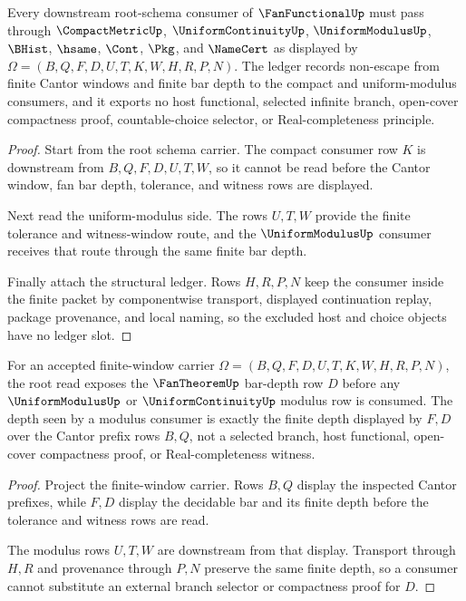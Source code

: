 \begin{theorem}
\label{thm:fanfunctional-root-schema-ledger}
Every downstream root-schema consumer of $\FanFunctionalUp$ must pass through $\CompactMetricUp$, $\UniformContinuityUp$, $\UniformModulusUp$, $\BHist$, $\hsame$, $\Cont$, $\Pkg$, and $\NameCert$ as displayed by $\Omega=(B,Q,F,D,U,T,K,W,H,R,P,N)$. The ledger records non-escape from finite Cantor windows and finite bar depth to the compact and uniform-modulus consumers, and it exports no host functional, selected infinite branch, open-cover compactness proof, countable-choice selector, or Real-completeness principle.
\end{theorem}
\begin{proof}
Start from the root schema carrier. The compact consumer row $K$ is downstream from $B,Q,F,D,U,T,W$, so it cannot be read before the Cantor window, fan bar depth, tolerance, and witness rows are displayed.

Next read the uniform-modulus side. The rows $U,T,W$ provide the finite tolerance and witness-window route, and the $\UniformModulusUp$ consumer receives that route through the same finite bar depth.

Finally attach the structural ledger. Rows $H,R,P,N$ keep the consumer inside the finite packet by componentwise transport, displayed continuation replay, package provenance, and local naming, so the excluded host and choice objects have no ledger slot.
\end{proof}





\begin{theorem}
\label{thm:fanfunctional-root-bar-depth-exactness}
For an accepted finite-window carrier $\Omega=(B,Q,F,D,U,T,K,W,H,R,P,N)$, the root read exposes the $\FanTheoremUp$ bar-depth row $D$ before any $\UniformModulusUp$ or $\UniformContinuityUp$ modulus row is consumed. The depth seen by a modulus consumer is exactly the finite depth displayed by $F,D$ over the Cantor prefix rows $B,Q$, not a selected branch, host functional, open-cover compactness proof, or Real-completeness witness.
\end{theorem}
\begin{proof}
Project the finite-window carrier. Rows $B,Q$ display the inspected Cantor prefixes, while $F,D$ display the decidable bar and its finite depth before the tolerance and witness rows are read.

The modulus rows $U,T,W$ are downstream from that display. Transport through $H,R$ and provenance through $P,N$ preserve the same finite depth, so a consumer cannot substitute an external branch selector or compactness proof for $D$.
\end{proof}

